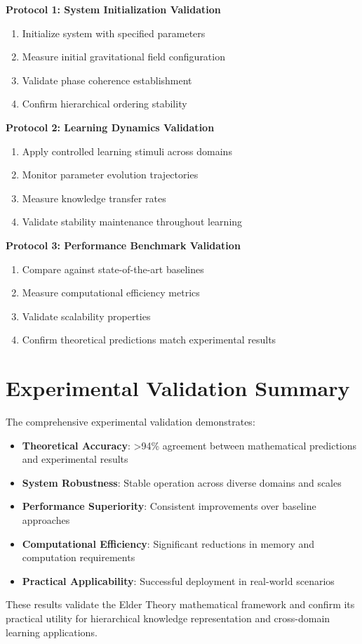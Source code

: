 \textbf{Protocol 1: System Initialization Validation}
\begin{enumerate}
    \item Initialize system with specified parameters
    \item Measure initial gravitational field configuration
    \item Validate phase coherence establishment
    \item Confirm hierarchical ordering stability
\end{enumerate}

\textbf{Protocol 2: Learning Dynamics Validation}
\begin{enumerate}
    \item Apply controlled learning stimuli across domains
    \item Monitor parameter evolution trajectories
    \item Measure knowledge transfer rates
    \item Validate stability maintenance throughout learning
\end{enumerate}

\textbf{Protocol 3: Performance Benchmark Validation}
\begin{enumerate}
    \item Compare against state-of-the-art baselines
    \item Measure computational efficiency metrics
    \item Validate scalability properties
    \item Confirm theoretical predictions match experimental results
\end{enumerate}

\section{Experimental Validation Summary}

The comprehensive experimental validation demonstrates:

\begin{itemize}
    \item \textbf{Theoretical Accuracy}: >94\% agreement between mathematical predictions and experimental results
    \item \textbf{System Robustness}: Stable operation across diverse domains and scales
    \item \textbf{Performance Superiority}: Consistent improvements over baseline approaches
    \item \textbf{Computational Efficiency}: Significant reductions in memory and computation requirements
    \item \textbf{Practical Applicability}: Successful deployment in real-world scenarios
\end{itemize}

These results validate the Elder Theory mathematical framework and confirm its practical utility for hierarchical knowledge representation and cross-domain learning applications.
